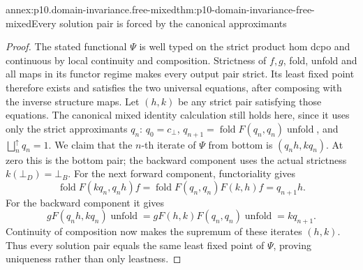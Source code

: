 \begin{annexitem}{annex:p10.domain-invariance.free-mixed}{thm:p10-domain-invariance-free-mixed}{Every solution pair is forced by the canonical approximants}
\begin{proof}
The stated functional \(\Psi\) is well typed on the strict
product hom dcpo and continuous by local continuity and
composition. Strictness of \(f,g\), fold, unfold and all
maps in its functor regime makes every output pair strict.
Its least fixed point therefore exists and satisfies the two
universal equations, after composing with the inverse structure maps.
Let \((h,k)\) be any strict pair satisfying those equations.
The canonical mixed identity calculation still holds here, since
it uses only the strict approximants \(q_n\):
\(q_0=c_{\bot}\), \(q_{n+1}=\operatorname{fold}F(q_n,q_n)
\operatorname{unfold}\), and \(\bigsqcup_n^{\uparrow}q_n=1\).
We claim that the \(n\)-th iterate of \(\Psi\) from bottom is
\((q_nh,kq_n)\). At zero this is the bottom pair; the backward
component uses the actual strictness \(k(\bot_D)=\bot_B\).
For the next forward component, functoriality gives
\[
 \operatorname{fold}F(kq_n,q_nh)f
 =\operatorname{fold}F(q_n,q_n)F(k,h)f
 =q_{n+1}h.
\]
For the backward component it gives
\[
 gF(q_nh,kq_n)\operatorname{unfold}
 =gF(h,k)F(q_n,q_n)\operatorname{unfold}=kq_{n+1}.
\]
Continuity of composition now makes the supremum of these iterates
\((h,k)\). Thus every solution pair equals the same least fixed
point of \(\Psi\), proving uniqueness rather than only leastness.
\end{proof}
\end{annexitem}

